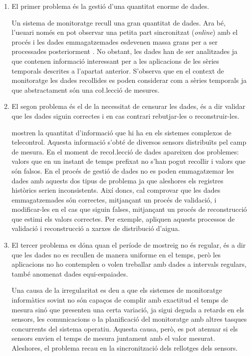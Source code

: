 \begin{enumerate}
\item El primer problema és la gestió d'una quantitat enorme de dades. 

Un sistema de monitoratge recull una gran quantitat de dades. Ara bé, l'usuari només en pot observar una petita part sincronitzat (\emph{online}) amb el procés i les dades emmagatzemades esdevenen massa grans per a ser processades posteriorment \parencite{keogh97}. No obstant, les dades han de ser analitzades ja que contenen informació interessant per a les aplicacions de les sèries temporals descrites a l'apartat anterior. S'observa que en el context de monitoratge les dades recollides es poden considerar com a sèries temporals ja que abstractament són una co\l.lecció de mesures.


\item El segon problema és el de la necessitat de censurar les dades, és a dir validar que les dades siguin correctes i en cas contrari rebutjar-les o reconstruir-les. 

\textcite{quevedo10} mostren la quantitat d'informació que hi ha en els sistemes complexos de telecontrol. Aquesta informació s'obté de diversos sensors distribuïts pel camp de mesura.
En el moment de reco\l.lecció de dades apareixen dos problemes: valors que en un instant de temps prefixat no s'han pogut recollir i valors que són falsos. En el procés de gestió de dades no es poden emmagatzemar les dades amb aquests dos tipus de problema ja que aleshores els registres històrics serien inconsistents. 
Així doncs, cal comprovar que les dades emmagatzemades són correctes, mitjançant un procés de validació, i modificar-les en el cas que siguin falses, mitjançant un procés de reconstrucció que estimi els valors correctes. Per exemple, \citeauthor{quevedo10} apliquen aquests processos de validació i reconstrucció a xarxes de distribució d'aigua.


\item El tercer problema es dóna quan el període de mostreig no és regular, és a dir que les dades no es recullen de manera uniforme en el temps, però les aplicacions no ho contemplen o volen treballar amb dades a intervals regulars, també anomenat dades equi-espaiades.

Una causa de la irregularitat es deu a que els sistemes de monitoratge informàtics sovint no són capaços de complir amb exactitud el temps de mesura sinó que presenten una certa variació, ja sigui deguda a retards en els sensors, les comunicacions o la planificació del monitoratge amb altres tasques concurrents del sistema operatiu. Aquesta causa, però, es pot atenuar si els sensors envien el temps de mesura juntament amb el valor mesurat. Aleshores, el problema recau en la sincronització dels rellotges dels sensors. 


\end{enumerate}
